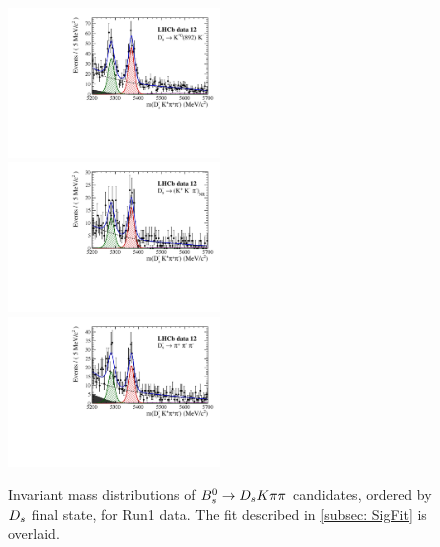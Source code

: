\begin{figure}[h]
\includegraphics[height=!,width=0.5\textwidth]{figs/MassFit/signal_y12_KsK.pdf}
\includegraphics[height=!,width=0.5\textwidth]{figs/MassFit/signal_y12_KKpi_NR.pdf}
\includegraphics[height=!,width=0.5\textwidth]{figs/MassFit/signal_y12_pipipi.pdf}
\caption{Invariant mass distributions of ${{B}^0_{s}}\rightarrow{\ensuremath{{D}_{s}}}{\ensuremath{K}}{\ensuremath{\pi}}{\ensuremath{\pi}}$ candidates, ordered by ${{D}_{s}}$ final state, for Run1 data.
The fit described in \ref{subsec: SigFit} is overlaid.}
\label{fig:massfits_signal_Run1}
\end{figure}

\clearpage

